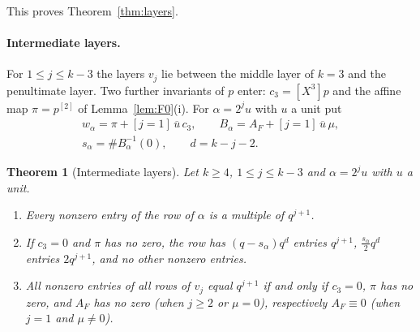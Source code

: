 \documentclass[11pt]{article}
\newtheorem{theorem}{Theorem}[section]
\theoremstyle{definition}
\theoremstyle{remark}
\newcommand{\ol}[1]{\overline{#1}}
\begin{document}
This proves Theorem~\ref{thm:layers}.

\paragraph{Intermediate layers.}
For $1\le j\le k-3$ the layers $v_j$ lie between the middle layer of $k=3$ and the penultimate layer. Two further
invariants of $p$ enter: $c_3=[X^3]p$ and the affine map $\pi=p^{[2]}$ of Lemma~\ref{lem:F0}(i). For $\alpha=2^ju$
with $u$ a unit put
\begin{gather*}
w_\alpha=\pi+[j=1]\,\ol u\,c_3,\qquad B_\alpha=A_F+[j=1]\,\ol u\,\mu,\\
s_\alpha=\#B_\alpha^{-1}(0),\qquad d=k-j-2 .
\end{gather*}

\begin{theorem}[Intermediate layers]\label{thm:inter}
Let $k\ge4$, $1\le j\le k-3$ and $\alpha=2^ju$ with $u$ a unit.
\begin{enumerate}[label=(\roman*)]
\item Every nonzero entry of the row of $\alpha$ is a multiple of $q^{j+1}$.
\item If $c_3=0$ and $\pi$ has no zero, the row has $(q-s_\alpha)q^{d}$ entries $q^{j+1}$, $\frac{s_\alpha}2q^{d}$ entries
$2q^{j+1}$, and no other nonzero entries.
\item All nonzero entries of all rows of $v_j$ equal $q^{j+1}$ if and only if $c_3=0$, $\pi$ has no zero, and $A_F$ has
no zero (when $j\ge2$ or $\mu=0$), respectively $A_F\equiv0$ (when $j=1$ and $\mu\ne0$).
\end{enumerate}
\end{theorem}
\end{document}
